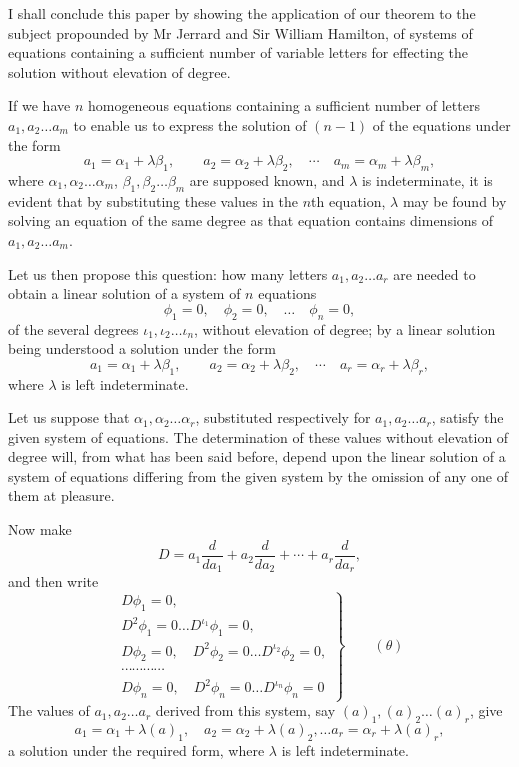 \documentclass[11pt]{article}
\newcommand{\sourcepage}[1]{\marginpar{\scriptsize p.~#1}}
\begin{document}
{{I shall conclude this paper by showing the application of our theorem to the subject propounded by Mr Jerrard and Sir William Hamilton, of systems of equations containing a sufficient number of variable letters for effecting the solution without elevation of degree.

If we have $n$ homogeneous equations containing a sufficient number of letters $a_1,a_2\ldots a_m$ to enable us to express the solution of $(n-1)$ of the equations under the form
\[
 a_1=\alpha_1+\lambda\beta_1,
 \qquad
 a_2=\alpha_2+\lambda\beta_2,
 \quad\cdots\quad
 a_m=\alpha_m+\lambda\beta_m,
\]
where $\alpha_1,\alpha_2\ldots\alpha_m$, $\beta_1,\beta_2\ldots\beta_m$ are supposed known, and $\lambda$ is indeterminate, it is evident that by substituting these values in the $n$th equation, $\lambda$ may be found by solving an equation of the same degree as that equation contains dimensions of $a_1,a_2\ldots a_m$.

Let us then propose this question: how many letters $a_1,a_2\ldots a_r$ are needed to obtain a linear solution of a system of $n$ equations
\[
 \phi_1=0,
 \quad \phi_2=0,
 \quad\ldots\quad
 \phi_n=0,
\]
of the several degrees $\iota_1,\iota_2\ldots\iota_n$, without elevation of degree; by a linear solution being understood a solution under the form
\[
 a_1=\alpha_1+\lambda\beta_1,
 \qquad
 a_2=\alpha_2+\lambda\beta_2,
 \quad\cdots\quad
 a_r=\alpha_r+\lambda\beta_r,
\]
where $\lambda$ is left indeterminate.

\sourcepage{179}
Let us suppose that $\alpha_1,\alpha_2\ldots\alpha_r$, substituted respectively for $a_1,a_2\ldots a_r$, satisfy the given system of equations. The determination of these values without elevation of degree will, from what has been said before, depend upon the linear solution of a system of equations differing from the given system by the omission of any one of them at pleasure.

Now make
\[
 D=a_1\frac{d}{da_1}+a_2\frac{d}{da_2}+\cdots+a_r\frac{d}{da_r},
\]
and then write
\[
\left.
\begin{array}{l}
D\phi_1=0,\\ D^2\phi_1=0\ldots D^{\iota_1}\phi_1=0,\\
D\phi_2=0,
\quad D^2\phi_2=0\ldots D^{\iota_2}\phi_2=0,\\
\cdots\cdots\cdots\cdots\\
D\phi_n=0,
\quad D^2\phi_n=0\ldots D^{\iota_n}\phi_n=0
\end{array}
\right\}\qquad(\theta)
\]
The values of $a_1,a_2\ldots a_r$ derived from this system, say $(a)_1,(a)_2\ldots(a)_r$, give
\[
 a_1=\alpha_1+\lambda(a)_1,
 \quad a_2=\alpha_2+\lambda(a)_2,
 \ldots
 a_r=\alpha_r+\lambda(a)_r,
\]
a solution under the required form, where $\lambda$ is left indeterminate.

}}
\end{document}
